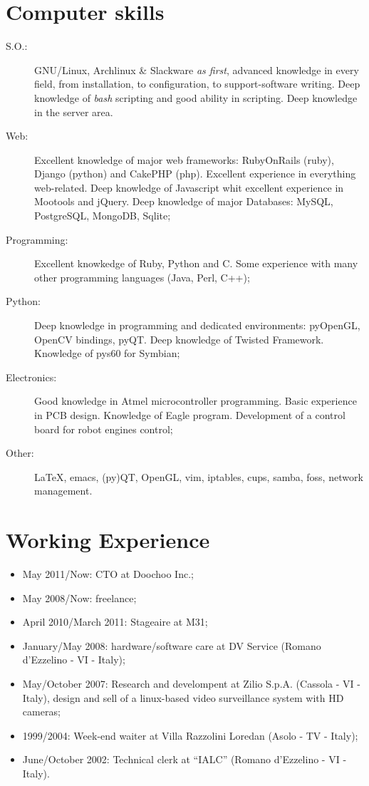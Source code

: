 \documentclass[pdftex, a4paper, 11pt]{article}
\begin{document}
\section*{Computer skills}
\begin{description}
\item[S.O.:] GNU/Linux, Archlinux \& Slackware {\em as first}, advanced knowledge
  in every field, from installation, to configuration, to support-software
  writing. Deep knowledge of {\em bash} scripting and good ability in scripting.
  Deep knowledge in the server area.
\item[Web:] Excellent knowledge of major web frameworks: RubyOnRails (ruby),
  Django (python) and CakePHP (php).
  Excellent experience in 
  everything web-related. 
  Deep knowledge of Javascript whit excellent experience in Mootools and jQuery.
  Deep knowledge of major Databases: MySQL, PostgreSQL, MongoDB, Sqlite;
\item[Programming:] Excellent knowkedge of Ruby, Python and C. Some experience with many other programming
  languages (Java, Perl, C++);
\item[Python:] Deep knowledge in programming and dedicated environments: pyOpenGL,
  OpenCV bindings, pyQT. Deep knowledge of Twisted Framework. Knowledge of pys60
  for Symbian;
\item[Electronics:] Good knowledge in Atmel microcontroller programming. Basic experience
  in PCB design. Knowledge of Eagle program. Development of a control board for robot
  engines control;
\item[Other:] \LaTeX, emacs, (py)QT, OpenGL, vim, iptables, cups,
  samba, foss, network management.
\end{description}

\section*{Working Experience}
\begin{itemize}
\item May 2011/Now: CTO at Doochoo Inc.;
\item May 2008/Now: freelance;
\item April 2010/March 2011: Stageaire at M31;
\item January/May 2008: hardware/software care at DV Service (Romano d'Ezzelino - VI - Italy);
\item May/October 2007: Research and develompent at Zilio
  S.p.A. (Cassola - VI - Italy), design and sell of a linux-based video surveillance
  system with HD cameras;
\item 1999/2004: Week-end waiter at Villa Razzolini Loredan (Asolo - TV - Italy);
\item June/October 2002: Technical clerk at ``IALC'' (Romano d'Ezzelino - VI - Italy).
\end{itemize}
\end{document}
